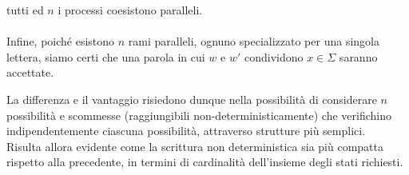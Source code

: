 \documentclass[a4paper,10pt]{article}
\begin{document}
tutti ed $n$ i processi coesistono paralleli. \\\\Infine, poiché esistono $n$ rami paralleli, ognuno specializzato per una singola lettera, siamo certi che una parola in cui $w$ e $w'$ condividono $x\in\Sigma$ saranno accettate.

La differenza e il vantaggio risiedono dunque nella possibilità di considerare $n$ possibilità e scommesse (raggiungibili non-deterministicamente) che verifichino indipendentemente ciascuna possibilità, attraverso strutture più semplici.\\

Risulta allora evidente come la scrittura non deterministica sia più compatta rispetto alla precedente, in termini di cardinalità dell'insieme degli stati richiesti. 


\vfill
\noindent\makebox[\linewidth]{\rule{\linewidth}{0.1pt}}
\end{document}
